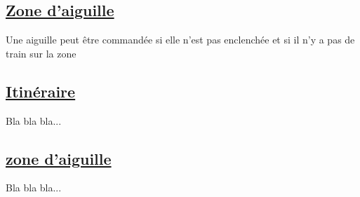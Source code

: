 \subsection{\underline{Zone d'aiguille}}
\label{sec:aig}

Une aiguille peut être commandée si elle n'est pas enclenchée et si il
n'y a pas de train sur la zone


\subsection{\underline{Itinéraire}}
\label{sec:iti}

Bla bla bla...

\subsection{\underline{zone d'aiguille}}
\label{sec:aig}

Bla bla bla...



\newpage





